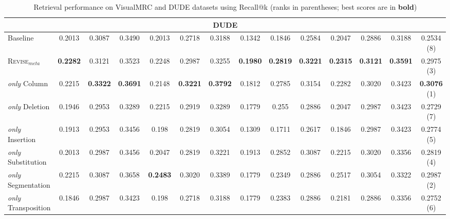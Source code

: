 \begin{table}[t!]
{\begin{tabular}{lccc ccc ccc ccc c}
\midrule
\multicolumn{14}{c}{DUDE}\\
\midrule


Baseline        
    & 0.2013
    & 0.3087
    & 0.3490
    & 0.2013
    & 0.2718
    & 0.3188
    & 0.1342 
    & 0.1846
    & 0.2584
    & 0.2047 
    & 0.2886
    & 0.3188
    & 0.2534 (8)\\\hline
    
\textsc{Revise}$_{meta}$           
    & \textbf{0.2282}
    & 0.3121
    & 0.3523
    & 0.2248
    & 0.2987
    & 0.3255
    & \textbf{0.1980}
    & \textbf{0.2819}
    & \textbf{0.3221}
    & \textbf{0.2315}
    & \textbf{0.3121}
    & \textbf{0.3591}
    & 0.2975 (3)\\


\textit{only} Column
    & 0.2215
    & \textbf{0.3322}
    & \textbf{0.3691}
    & 0.2148
    & \textbf{0.3221}
    & \textbf{0.3792}
    & 0.1812
    & 0.2785
    & 0.3154
    & 0.2282
    & 0.3020 
    & 0.3423
    & \textbf{0.3076} (1)\\
    
\textit{only} Deletion
    & 0.1946
    & 0.2953
    & 0.3289
    & 0.2215
    & 0.2919
    & 0.3289
    & 0.1779
    & 0.255
    & 0.2886
    & 0.2047
    & 0.2987
    & 0.3423
    & 0.2729 (7)\\
    
\textit{only} Insertion
    & 0.1913
    & 0.2953
    & 0.3456
    & 0.198
    & 0.2819
    & 0.3054
    & 0.1309
    & 0.1711 
    & 0.2617
    & 0.1846
    & 0.2987
    & 0.3423
    & 0.2774 (5)\\
    
\textit{only} Substitution
    & 0.2013
    & 0.2987
    & 0.3456
    & 0.2047
    & 0.2819
    & 0.3221
    & 0.1913
    & 0.2852
    & 0.3087
    & 0.2215
    & 0.3020
    & 0.3356
    & 0.2819 (4)\\
    
\textit{only} Segmentation
    & 0.2215
    & 0.3087
    & 0.3658
    & \textbf{0.2483}
    & 0.3020 
    & 0.3389
    & 0.1779
    & 0.2349
    & 0.2886
    & 0.2517
    & 0.3054
    & 0.3322
    & 0.2987 (2)\\
    
\textit{only} Transposition
    & 0.1846
    & 0.2987
    & 0.3423
    & 0.198
    & 0.2718
    & 0.3188
    & 0.1779
    & 0.2383
    & 0.2886
    & 0.2181 
    & 0.2886
    & 0.3356
    & 0.2752 (6)\\
\bottomrule
\end{tabular}
}

\caption{Retrieval performance on VisualMRC and DUDE datasets using Recall@k (ranks in parentheses; best scores are in \textbf{bold})}
\label{tab:retrieval}
\end{table}